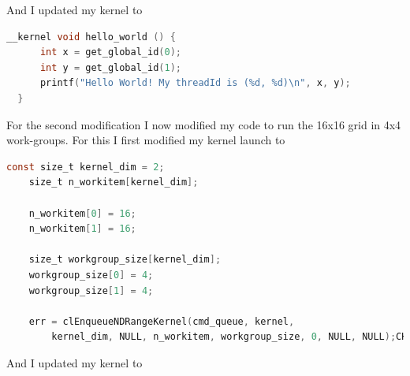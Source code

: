 \documentclass{article}
\begin{document}
And I updated my kernel to

\begin{mdframed}[backgroundcolor=codeColor,leftmargin=0.0cm,hidealllines=true,%
  innerleftmargin=0.1cm,innerrightmargin=0.1cm,innertopmargin=0.5cm,innerbottommargin=0.10cm,
  roundcorner=15pt]
\begin{lstlisting}[language=C]
  __kernel void hello_world () {
      int x = get_global_id(0);
      int y = get_global_id(1);
      printf("Hello World! My threadId is (%d, %d)\n", x, y);
  }
\end{lstlisting}
\end{mdframed}

\newpage 
For the second modification I now modified my code to run the 16x16 grid in 4x4 work-groups. For this I first modified my kernel launch to

\begin{mdframed}[backgroundcolor=codeColor,leftmargin=0.0cm,hidealllines=true,%
  innerleftmargin=0.1cm,innerrightmargin=0.1cm,innertopmargin=0.5cm,innerbottommargin=0.10cm,
  roundcorner=15pt]
\begin{lstlisting}[language=C]
    const size_t kernel_dim = 2;
    size_t n_workitem[kernel_dim];
  
    n_workitem[0] = 16;
    n_workitem[1] = 16;
  
    size_t workgroup_size[kernel_dim];
    workgroup_size[0] = 4;
    workgroup_size[1] = 4;
  
    err = clEnqueueNDRangeKernel(cmd_queue, kernel, 
        kernel_dim, NULL, n_workitem, workgroup_size, 0, NULL, NULL);CHK_ERROR(err);
\end{lstlisting}
\end{mdframed}

And I updated my kernel to
\end{document}
